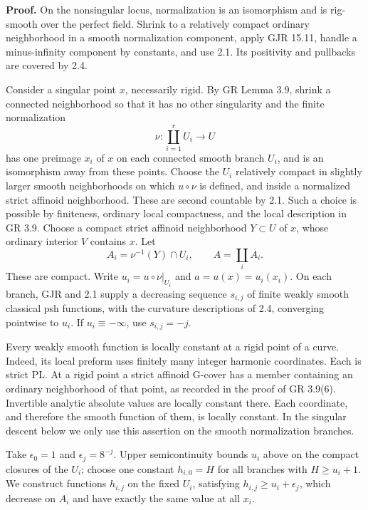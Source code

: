\documentclass[11pt]{article}
\begin{document}
\textbf{Proof.} On the nonsingular locus, normalization is an isomorphism and is rig-smooth over the perfect field. Shrink to a relatively compact ordinary neighborhood in a smooth normalization component, apply GJR 15.11, handle a minus-infinity component by constants, and use 2.1. Its positivity and pullbacks are covered by 2.4.

Consider a singular point \(x\), necessarily rigid. By GR Lemma 3.9, shrink a connected neighborhood so that it has no other singularity and the finite normalization
\[
\nu:\coprod_{i=1}^r U_i\longrightarrow U
\]
has one preimage \(x_i\) of \(x\) on each connected smooth branch \(U_i\), and is an isomorphism away from these points. Choose the \(U_i\) relatively compact in slightly larger smooth neighborhoods on which \(u\circ\nu\) is defined, and inside a normalized strict affinoid neighborhood. These are second countable by 2.1. Such a choice is possible by finiteness, ordinary local compactness, and the local description in GR 3.9. Choose a compact strict affinoid neighborhood \(Y\subset U\) of \(x\), whose ordinary interior \(V\) contains \(x\). Let
\[
A_i=\nu^{-1}(Y)\cap U_i,\qquad A=\coprod_i A_i.
\]
These are compact. Write \(u_i=u\circ\nu|_{U_i}\) and \(a=u(x)=u_i(x_i)\). On each branch, GJR and 2.1 supply a decreasing sequence \(s_{i,j}\) of finite weakly smooth classical psh functions, with the curvature descriptions of 2.4, converging pointwise to \(u_i\). If \(u_i\equiv-\infty\), use \(s_{i,j}=-j\).

Every weakly smooth function is locally constant at a rigid point of a curve. Indeed, its local preform uses finitely many integer harmonic coordinates. Each is strict PL. At a rigid point a strict affinoid G-cover has a member containing an ordinary neighborhood of that point, as recorded in the proof of GR 3.9(6). Invertible analytic absolute values are locally constant there. Each coordinate, and therefore the smooth function of them, is locally constant. In the singular descent below we only use this assertion on the smooth normalization branches.

Take \(\epsilon_0=1\) and \(\epsilon_j=8^{-j}\). Upper semicontinuity bounds \(u_i\) above on the compact closures of the \(U_i\); choose one constant \(h_{i,0}=H\) for all branches with \(H\ge u_i+1\). We construct functions \(h_{i,j}\) on the fixed \(U_i\), satisfying \(h_{i,j}\ge u_i+\epsilon_j\), which decrease on \(A_i\) and have exactly the same value at all \(x_i\).
\end{document}
